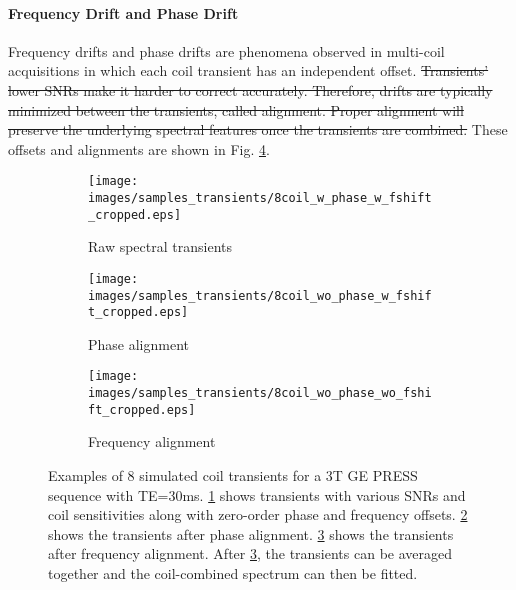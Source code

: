 \documentclass[AMA,LATO1COL]{WileyNJD-v2}
\providecommand{\DIFdel}[1]{{\protect\color{red}\sout{#1}}}                      %
\providecommand{\DIFdelbegin}{} %
\providecommand{\DIFdelend}{} %
\providecommand{\DIFaddbeginFL}{} %
\providecommand{\DIFaddendFL}{} %
\providecommand{\DIFdelendFL}{} %
\begin{document}
\paragraph{Frequency Drift and Phase Drift}
Frequency drifts and phase drifts are phenomena observed in multi-coil acquisitions in which each coil transient has an independent offset. \DIFdelbegin \DIFdel{Transients’ lower SNRs make it harder to correct accurately. Therefore, drifts are typically minimized between the transients, called alignment. Proper alignment will preserve the underlying spectral features once the transients are combined. }\DIFdelend %
These offsets and alignments are shown in Fig. \ref{fig:simulated transients}.

\DIFdelbegin %
\DIFdelendFL \DIFaddbeginFL \begin{figure}[b]
    \DIFaddendFL \centering
    \begin{subfigure}{0.32\textwidth}
        \texttt{[image: images/samples\_transients/8coil\_w\_phase\_w\_fshift\_cropped.eps]}
        \caption{Raw spectral transients}
        \label{subfig:raw transients}        
    \end{subfigure}
    \begin{subfigure}{0.32\textwidth}
        \texttt{[image: images/samples\_transients/8coil\_wo\_phase\_w\_fshift\_cropped.eps]}
        \caption{Phase alignment}
        \label{subfig:phase alignment}        
    \end{subfigure}
    \begin{subfigure}{0.32\textwidth}
        \texttt{[image: images/samples\_transients/8coil\_wo\_phase\_wo\_fshift\_cropped.eps]}
        \caption{Frequency alignment}
        \label{subfig:frequency alignment}        
    \end{subfigure}
    \caption{Examples of 8 simulated coil transients for a 3T GE PRESS sequence with TE=30ms. \ref{subfig:raw transients} shows transients with various SNRs and coil sensitivities along with zero-order phase and frequency offsets. \ref{subfig:phase alignment} shows the transients after phase alignment. \ref{subfig:frequency alignment} shows the transients after frequency alignment. After \ref{subfig:frequency alignment}, the transients can be averaged together and the coil-combined spectrum can then be fitted.}
    \label{fig:simulated transients}
\end{figure}
\end{document}

